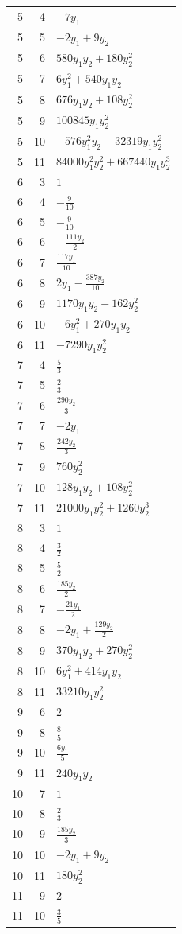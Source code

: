 \documentclass[10pt,a4paper]{article}
\begin{document}
{\begin{longtable}{rrp{125mm}}
5 & 4 & $- 7 y_{1}$\\
5 & 5 & $- 2 y_{1} + 9 y_{2}$\\
5 & 6 & $580 y_{1} y_{2} + 180 y_{2}^{2}$\\
5 & 7 & $6 y_{1}^{2} + 540 y_{1} y_{2}$\\
5 & 8 & $676 y_{1} y_{2} + 108 y_{2}^{2}$\\
5 & 9 & $100845 y_{1} y_{2}^{2}$\\
5 & 10 & $- 576 y_{1}^{2} y_{2} + 32319 y_{1} y_{2}^{2}$\\
5 & 11 & $84000 y_{1}^{2} y_{2}^{2} + 667440 y_{1} y_{2}^{3}$\\
6 & 3 & $1$\\
6 & 4 & $- \frac{9}{10}$\\
6 & 5 & $- \frac{9}{10}$\\
6 & 6 & $- \frac{111 y_{2}}{2}$\\
6 & 7 & $\frac{117 y_{1}}{10}$\\
6 & 8 & $2 y_{1} - \frac{387 y_{2}}{10}$\\
6 & 9 & $1170 y_{1} y_{2} - 162 y_{2}^{2}$\\
6 & 10 & $- 6 y_{1}^{2} + 270 y_{1} y_{2}$\\
6 & 11 & $- 7290 y_{1} y_{2}^{2}$\\
7 & 4 & $\frac{5}{3}$\\
7 & 5 & $\frac{2}{3}$\\
7 & 6 & $\frac{290 y_{2}}{3}$\\
7 & 7 & $- 2 y_{1}$\\
7 & 8 & $\frac{242 y_{2}}{3}$\\
7 & 9 & $760 y_{2}^{2}$\\
7 & 10 & $128 y_{1} y_{2} + 108 y_{2}^{2}$\\
7 & 11 & $21000 y_{1} y_{2}^{2} + 1260 y_{2}^{3}$\\
8 & 3 & $1$\\
8 & 4 & $\frac{3}{2}$\\
8 & 5 & $\frac{5}{2}$\\
8 & 6 & $\frac{185 y_{2}}{2}$\\
8 & 7 & $- \frac{21 y_{1}}{2}$\\
8 & 8 & $- 2 y_{1} + \frac{129 y_{2}}{2}$\\
8 & 9 & $370 y_{1} y_{2} + 270 y_{2}^{2}$\\
8 & 10 & $6 y_{1}^{2} + 414 y_{1} y_{2}$\\
8 & 11 & $33210 y_{1} y_{2}^{2}$\\
9 & 6 & $2$\\
9 & 8 & $\frac{8}{5}$\\
9 & 10 & $\frac{6 y_{1}}{5}$\\
9 & 11 & $240 y_{1} y_{2}$\\
10 & 7 & $1$\\
10 & 8 & $\frac{2}{3}$\\
10 & 9 & $\frac{185 y_{2}}{3}$\\
10 & 10 & $- 2 y_{1} + 9 y_{2}$\\
10 & 11 & $180 y_{2}^{2}$\\
11 & 9 & $2$\\
11 & 10 & $\frac{3}{5}$\\
\end{longtable}}
\end{document}
